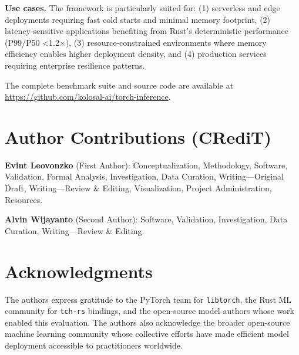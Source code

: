 \documentclass[10pt,twocolumn,a4paper]{article}
\theoremstyle{definition}
\theoremstyle{plain}
\begin{document}
\textbf{Use cases.} The framework is particularly suited for: (1) serverless and edge deployments requiring fast cold starts and minimal memory footprint, (2) latency-sensitive applications benefiting from Rust's deterministic performance (P99/P50 \textless 1.2$\times$), (3) resource-constrained environments where memory efficiency enables higher deployment density, and (4) production services requiring enterprise resilience patterns.

The complete benchmark suite and source code are available at \url{https://github.com/kolosal-ai/torch-inference}.

\section*{Author Contributions (CRediT)}

\noindent\textbf{Evint Leovonzko} (First Author): Conceptualization, Methodology, Software, Validation, Formal Analysis, Investigation, Data Curation, Writing---Original Draft, Writing---Review \& Editing, Visualization, Project Administration, Resources.

\noindent\textbf{Alvin Wijayanto} (Second Author): Software, Validation, Investigation, Data Curation, Writing---Review \& Editing.

\section*{Acknowledgments}

The authors express gratitude to the PyTorch team for \texttt{libtorch}, the Rust ML community for \texttt{tch-rs} bindings, and the open-source model authors whose work enabled this evaluation. The authors also acknowledge the broader open-source machine learning community whose collective efforts have made efficient model deployment accessible to practitioners worldwide.
\end{document}
